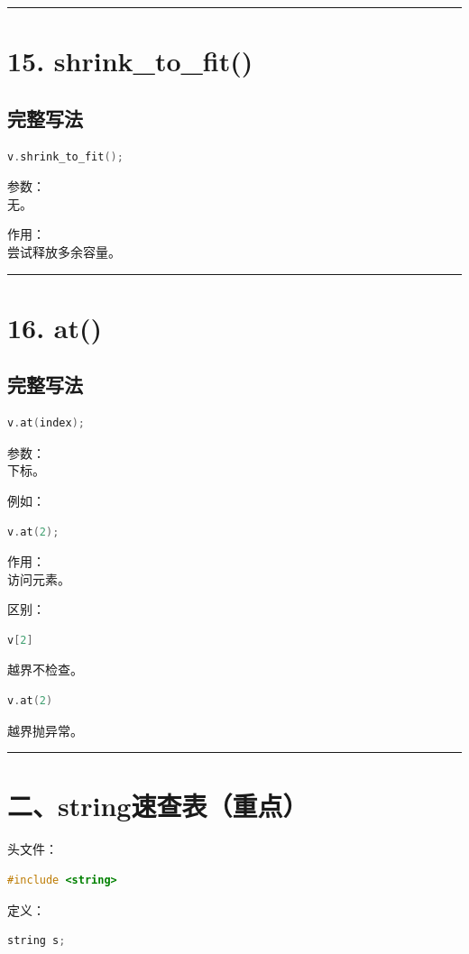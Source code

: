 \documentclass[10pt,twocolumn]{extarticle}
\begin{document}
\noindent\rule{\linewidth}{0.4pt}

\section{15. shrink\_to\_fit()}

\subsection{完整写法}
\begin{lstlisting}[language=C++]
v.shrink_to_fit();
\end{lstlisting}
参数：\\
无。

作用：\\
尝试释放多余容量。

\noindent\rule{\linewidth}{0.4pt}

\section{16. at()}

\subsection{完整写法}
\begin{lstlisting}[language=C++]
v.at(index);
\end{lstlisting}
参数：\\
下标。

例如：
\begin{lstlisting}[language=C++]
v.at(2);
\end{lstlisting}
作用：\\
访问元素。

区别：
\begin{lstlisting}[language=C++]
v[2]
\end{lstlisting}
越界不检查。
\begin{lstlisting}[language=C++]
v.at(2)
\end{lstlisting}
越界抛异常。

\noindent\rule{\linewidth}{0.4pt}

\section{二、string速查表（重点）}

头文件：
\begin{lstlisting}[language=C++]
#include <string>
\end{lstlisting}
定义：
\begin{lstlisting}[language=C++]
string s;
\end{lstlisting}
\end{document}
